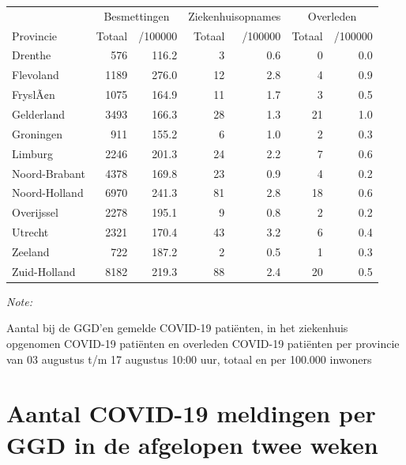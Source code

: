 \documentclass[
  english,
  man,floatsintext]{apa6}
\begin{document}
\begin{table}
\centering
\begin{threeparttable}
\begin{tabular}{lrrrrrr}
\toprule
\multicolumn{1}{c}{ } & \multicolumn{2}{c}{Besmettingen} & \multicolumn{2}{c}{Ziekenhuisopnames} & \multicolumn{2}{c}{Overleden} \\
\cmidrule(l{3pt}r{3pt}){2-3} \cmidrule(l{3pt}r{3pt}){4-5} \cmidrule(l{3pt}r{3pt}){6-7}
Provincie & Totaal & /100000 & Totaal & /100000 & Totaal & /100000\\
\midrule
Drenthe & 576 & 116.2 & 3 & 0.6 & 0 & 0.0\\
Flevoland & 1189 & 276.0 & 12 & 2.8 & 4 & 0.9\\
FryslÃ¢n & 1075 & 164.9 & 11 & 1.7 & 3 & 0.5\\
Gelderland & 3493 & 166.3 & 28 & 1.3 & 21 & 1.0\\
Groningen & 911 & 155.2 & 6 & 1.0 & 2 & 0.3\\
Limburg & 2246 & 201.3 & 24 & 2.2 & 7 & 0.6\\
Noord-Brabant & 4378 & 169.8 & 23 & 0.9 & 4 & 0.2\\
Noord-Holland & 6970 & 241.3 & 81 & 2.8 & 18 & 0.6\\
Overijssel & 2278 & 195.1 & 9 & 0.8 & 2 & 0.2\\
Utrecht & 2321 & 170.4 & 43 & 3.2 & 6 & 0.4\\
Zeeland & 722 & 187.2 & 2 & 0.5 & 1 & 0.3\\
Zuid-Holland & 8182 & 219.3 & 88 & 2.4 & 20 & 0.5\\
\bottomrule
\end{tabular}
\begin{tablenotes}
\item \textit{Note: } 
\item Aantal bij de GGD’en gemelde COVID-19 patiënten, in het ziekenhuis opgenomen COVID-19 patiënten en overleden COVID-19 patiënten per provincie van 03 augustus t/m 17 augustus 10:00 uur, totaal en per 100.000 inwoners
\end{tablenotes}
\end{threeparttable}
\end{table}

\newpage

\hypertarget{aantal-covid-19-meldingen-per-ggd-in-de-afgelopen-twee-weken}{%
\section{Aantal COVID-19 meldingen per GGD in de afgelopen twee weken}\label{aantal-covid-19-meldingen-per-ggd-in-de-afgelopen-twee-weken}}
\end{document}
